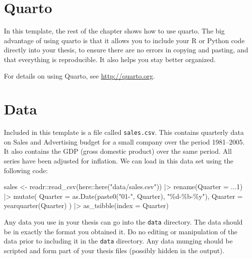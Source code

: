 \documentclass[
  11pt,
  a4paper,
  nottoc]{report}
\newenvironment{Shaded}{}{}
\newcommand{\AttributeTok}[1]{\textcolor[rgb]{0.84,0.23,0.29}{#1}}
\newcommand{\FunctionTok}[1]{\textcolor[rgb]{0.44,0.26,0.76}{#1}}
\newcommand{\NormalTok}[1]{\textcolor[rgb]{0.14,0.16,0.18}{#1}}
\newcommand{\OtherTok}[1]{\textcolor[rgb]{0.44,0.26,0.76}{#1}}
\newcommand{\SpecialCharTok}[1]{\textcolor[rgb]{0.00,0.36,0.77}{#1}}
\newcommand{\StringTok}[1]{\textcolor[rgb]{0.01,0.18,0.38}{#1}}
\begin{document}
\section{Quarto}\label{quarto}

In this template, the rest of the chapter shows how to use quarto. The
big advantage of using quarto is that it allows you to include your R or
Python code directly into your thesis, to ensure there are no errors in
copying and pasting, and that everything is reproducible. It also helps
you stay better organized.

For details on using Quarto, see \url{http://quarto.org}.

\section{Data}\label{data}

Included in this template is a file called \texttt{sales.csv}. This
contains quarterly data on Sales and Advertising budget for a small
company over the period 1981--2005. It also contains the GDP (gross
domestic product) over the same period. All series have been adjusted
for inflation. We can load in this data set using the following code:

\begin{Shaded}
\begin{Highlighting}[]
\NormalTok{sales }\OtherTok{\textless{}{-}}\NormalTok{ readr}\SpecialCharTok{::}\FunctionTok{read\_csv}\NormalTok{(here}\SpecialCharTok{::}\FunctionTok{here}\NormalTok{(}\StringTok{"data/sales.csv"}\NormalTok{)) }\SpecialCharTok{|\textgreater{}}
  \FunctionTok{rename}\NormalTok{(}\AttributeTok{Quarter =} \StringTok{\textasciigrave{}}\AttributeTok{...1}\StringTok{\textasciigrave{}}\NormalTok{) }\SpecialCharTok{|\textgreater{}}
  \FunctionTok{mutate}\NormalTok{(}
    \AttributeTok{Quarter =} \FunctionTok{as.Date}\NormalTok{(}\FunctionTok{paste0}\NormalTok{(}\StringTok{"01{-}"}\NormalTok{, Quarter), }\StringTok{"\%d{-}\%b{-}\%y"}\NormalTok{),}
    \AttributeTok{Quarter =} \FunctionTok{yearquarter}\NormalTok{(Quarter)}
\NormalTok{  ) }\SpecialCharTok{|\textgreater{}}
  \FunctionTok{as\_tsibble}\NormalTok{(}\AttributeTok{index =}\NormalTok{ Quarter)}
\end{Highlighting}
\end{Shaded}

Any data you use in your thesis can go into the \texttt{data} directory.
The data should be in exactly the format you obtained it. Do no editing
or manipulation of the data prior to including it in the \texttt{data}
directory. Any data munging should be scripted and form part of your
thesis files (possibly hidden in the output).
\end{document}
